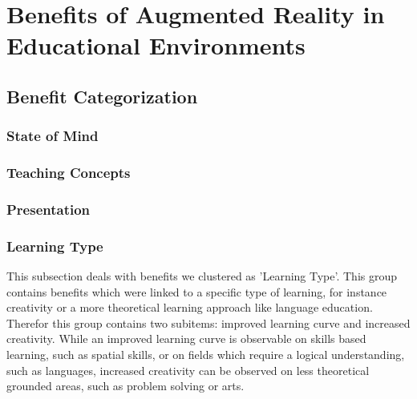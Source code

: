 \section{Benefits of Augmented Reality in Educational Environments}
\subsection{Benefit Categorization}
\label{subsec:Benefits}

% 
\subsubsection{State of Mind}

% 
\subsubsection{Teaching Concepts}

% 
\subsubsection{Presentation}

% 
\subsubsection{Learning Type}
This subsection deals with benefits we clustered as 'Learning Type'. This group contains benefits which were linked to a specific type of learning, for instance creativity or a more theoretical learning approach like language education. \\
Therefor this group contains two subitems: improved learning curve and increased creativity. While an improved learning curve is observable on skills based learning, such as spatial skills, or on fields which require a logical understanding, such as languages, increased creativity can be observed on less theoretical grounded areas, such as problem solving or arts.

